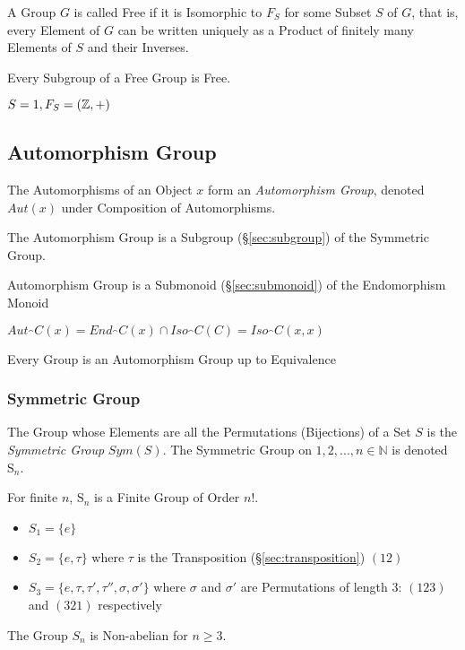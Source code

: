 A Group $G$ is called Free if it is Isomorphic to $F_S$ for some
Subset $S$ of $G$, that is, every Element of $G$ can be written
uniquely as a Product of finitely many Elements of $S$ and their
Inverses.

Every Subgroup of a Free Group is Free. \cite{hatcher02}

$S = {1}, F_S = (\mathbb{Z},+)$



\subsection{Automorphism Group}\label{sec:automorphism_group}

The Automorphisms of an Object $x$ form an \emph{Automorphism Group},
denoted $Aut(x)$ under Composition of Automorphisms.

The Automorphism Group is a Subgroup (\S\ref{sec:subgroup}) of the
Symmetric Group.

Automorphism Group is a Submonoid (\S\ref{sec:submonoid})
of the Endomorphism Monoid %

$Aut_\cat{C}(x) = End_\cat{C}(x) \cap Iso_\cat{C}(C) =
Iso_\cat{C}(x,x)$

Every Group is an Automorphism Group up to Equivalence %



\subsubsection{Symmetric Group}\label{sec:symmetric_group}

The Group whose Elements are all the Permutations (Bijections) of a
Set $S$ is the \emph{Symmetric Group} $Sym(S)$. The Symmetric Group on
${1, 2, ..., n} \in \mathbb{N}$ is denoted $\mathrm{S}_n$.

For finite $n$, $\mathrm{S}_n$ is a Finite Group of Order $n!$.

\begin{itemize}
    \item $S_1 = \{e\}$
    \item $S_2 = \{e,\tau\}$ where $\tau$ is the Transposition
      (\S\ref{sec:transposition}) $(12)$
    \item $S_3 = \{e, \tau, \tau', \tau'', \sigma, \sigma'\}$ where
      $\sigma$ and $\sigma'$ are Permutations of length 3: $(123)$ and
      $(321)$ respectively
\end{itemize}
The Group $S_n$ is Non-abelian for $n \geq 3$.


